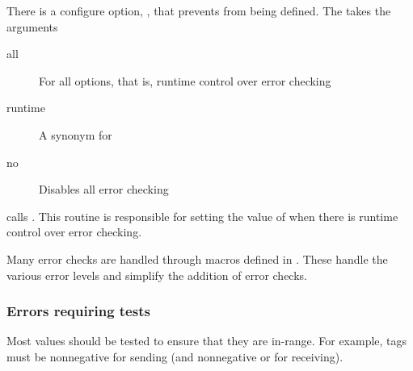 \documentclass{article}
\begin{document}
There is a configure option,
,  
that prevents  from being defined.  The
takes the arguments
\begin{description}
\item[all]For all options, that is, runtime control over error checking
\item[runtime]A synonym for 
\item[no]Disables all error checking
\end{description}

 calls .  This
routine is responsible for setting the value of
 when there is runtime control over
error checking.

Many error checks are handled through macros defined in
.  These handle the various error levels
and simplify the addition of error checks.

\subsubsection{Errors requiring tests}
Most values should be tested to ensure that they are in-range.  For example,
tags must be nonnegative for sending (and nonnegative or
 for receiving). 
\end{document}

